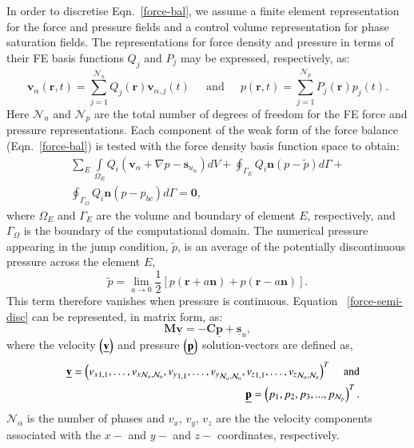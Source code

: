 \documentclass[preprint,authoryear,12pt]{elsarticle}
\begin{document}
In order to discretise Eqn.~\ref{force-bal}, we assume a finite element representation for the force and pressure fields and a control volume representation for phase saturation fields. The representations for force density and pressure in terms of their FE basis functions $Q_{j}$ and $P_{j}$  may be expressed, respectively, as:
\begin{displaymath}
  \bm{v}_\alpha(\bm{r},t) = \sum\limits_{j=1}^{\mathcal{N}_u} Q_{j}(\bm{r})\bm{v}_{\alpha,j}(t) \;\;\;\;\text{ and } \;\;\;\; p(\bm{r},t)  = \sum\limits_{j=1}^{\mathcal{N}_p} P_{j}(\bm{r})p_{j}(t).
\end{displaymath} 
Here $\mathcal{N}_{u}$ and $\mathcal{N}_{p}$ are the total number of degrees of freedom for the FE force and pressure representations. Each component of the weak form of the force balance (Eqn.~\ref{force-bal}) is tested with the force density basis function space to obtain:
\begin{eqnarray}
  \sum\limits_{E} \left. \int\limits_{\Omega_E} { {Q}}_i
   \left ( {\mathbf v}_\alpha + \nabla p
  -{\mathbf s}_{u_\alpha} \right) dV \right. + \displaystyle
  \oint_{\Gamma_{E}} {Q}_i {\mathbf n} \left(p - \tilde{p}\right) d\Gamma
  + \nonumber \\ 
  \oint_{\Gamma_{\Omega}} { Q}_i {\mathbf n} \left(p -
  p_{bc}\right) d\Gamma = \bm{0},
  \label{force-semi-disc} 
\end{eqnarray} 
where $\Omega_E$ and $\Gamma_{E}$ are the volume and boundary of element $E$, respectively, and $\Gamma_{\Omega}$ is the boundary of the computational domain. The numerical pressure appearing in the jump condition, $\tilde{p}$, is an average of the potentially discontinuous pressure across the element $E$,
\[\tilde{p}=\lim_{a\rightarrow 0} 
   \frac{1}{2}\left[p(\bm{r}+a\bm{n})+p(\bm{r}-a\bm{n})\right].\] This term therefore vanishes when pressure is continuous. Equation ~\ref{force-semi-disc} can be represented, in matrix form, as:
\begin{equation}
  {\mathbf M} \underline {\mathbf v} = -{\mathbf C} \underline {\mathbf p} + \underline {\mathbf s}_{u}, \label{force-balance-matrix-form}
\end{equation}
where the velocity $\left(\underline{\bf v}\right)$ and pressure $\left(\underline{\bf p}\right)$ solution-vectors are defined as,
\begin{eqnarray}
  &&\underline{{\bf v}} = \left({v_x}_{1,1},\ldots,{v_x}_{\mathcal{N}_\alpha,
    \mathcal{N}_u}, {v_y}_{1,1},\ldots,{v_y}_{\mathcal{N}_\alpha,
    \mathcal{N}_u},{v_z}_{1,1},\ldots,{v_z}_{\mathcal{N}_\alpha,
    \mathcal{N}_u}\right)^{T} \;\;\;\;\text{and} \nonumber \\ &&
  \underline{{\bf p}} = \left(p_1, p_2, p_3, ...,
  p_{\mathcal{N}_p}\right)^T. \nonumber \nonumber
\end{eqnarray}
$\mathcal{N}_{\alpha}$ is the number of phases and $v_x$, $v_y$, $v_z$ are the the velocity components associated with the $x-$ and $y-$ and $z-$ coordinates, respectively. 
\end{document}
